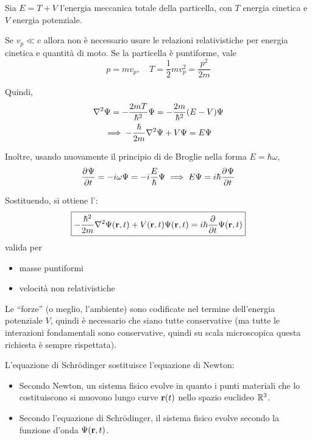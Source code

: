 Sia $E = T + V$ l'energia meccanica totale della particella, con $T$ energia cinetica e $V$ energia potenziale.

Se $v_p \ll c$ allora non è necessario usare le relazioni relativistiche per energia cinetica e quantità di moto.
Se la particella è puntiforme, vale
\begin{equation}
    p = m v_p, \quad
    T = \frac{1}{2} m v_p^2 = \frac{p^2}{2 m}
\end{equation}

Quindi,
\begin{gather}
    \nabla^2 \Psi = - \frac{2 m T}{\hbar^2} \Psi = - \frac{2 m}{\hbar^2} (E - V) \Psi \\
    \implies - \frac{\hbar}{2 m} \nabla^2 \Psi + V \Psi = E \Psi
\end{gather}

Inoltre, usando nuovamente il principio di de Broglie nella forma $E = \hbar \omega$,
\begin{equation}
    \parder[\Psi]{t}
    = - \im \omega \Psi
    = - \im \frac{E}{\hbar} \Psi
    \implies
    E \Psi = \im \hbar \parder[\Psi]{t}
\end{equation}

Sostituendo, si ottiene l':
\begin{equation}
    \boxed{
    -\frac{\hbar^2}{2 m} \lapl \Psi(\p, t) + V(\p, t) \Psi(\p, t) = \im \hbar \parder{t} \Psi(\p, t)
    }
\end{equation}
valida per
\begin{itemize}
    \item masse puntiformi
    \item velocità non relativistiche
\end{itemize}

Le ``forze'' (o meglio, l'ambiente) sono codificate nel termine dell'energia potenziale $V$, quindi è necessario che siano tutte conservative (ma tutte le interazioni fondamentali sono conservative, quindi su scala microscopica questa richiesta è sempre rispettata).

L'equazione di Schrödinger sostituisce l'equazione di Newton:
\begin{itemize}
    \item Secondo Newton, un sistema fisico evolve in quanto i punti materiali che lo costituiscono si muovono lungo curve $\mathbf{r}(t)$ nello spazio euclideo $\mathbb{R}^3$.
    \item Secondo l'equazione di Schrödinger, il sistema fisico evolve secondo la funzione d'onda $\Psi(\mathbf{r}, t)$.
\end{itemize}


